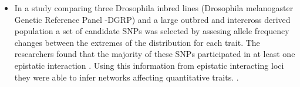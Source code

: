 \begin{itemize}
	\item In a study comparing three Drosophila inbred lines (Drosophila melanogaster Genetic Reference Panel -DGRP) and a large outbred and intercross derived  population \cite{huang2012epistasis}a set of candidate SNPs was selected by assesing allele frequency changes between the extremes of the distribution for each trait. 
The researchers found that the majority of these SNPs participated in at least one epistatic interaction \cite{huang2012epistasis}.
Using this information from epistatic interacting loci they were able to infer networks affecting quantitative traits. \cite{huang2012epistasis}.

\end{itemize}



